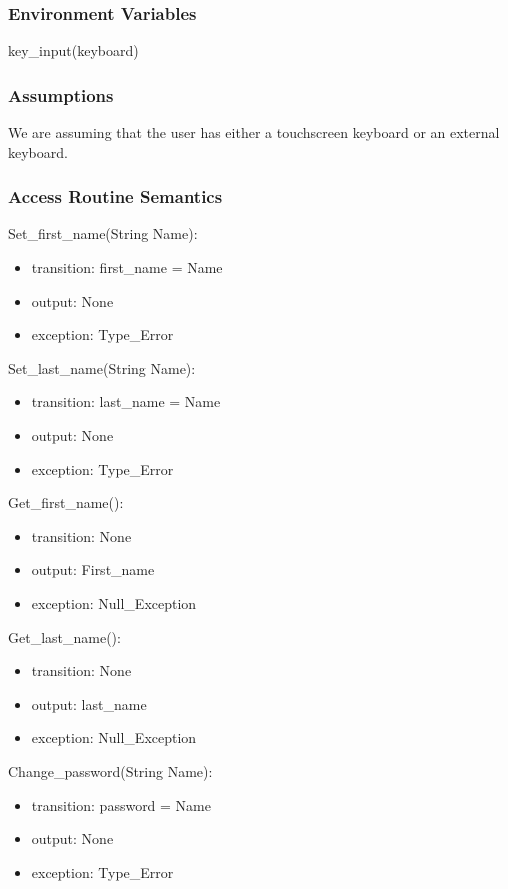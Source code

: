 \documentclass[12pt, titlepage]{article}
\begin{document}
\subsubsection{Environment Variables}

key\_input(keyboard)

\subsubsection{Assumptions}

We are assuming that the user has either a touchscreen keyboard or an external keyboard.

\subsubsection{Access Routine Semantics}

\noindent Set\_first\_name(String Name):
\begin{itemize}
\item transition: first\_name = Name
\item output: None 
\item exception: Type\_Error 
\end{itemize}

\noindent Set\_last\_name(String Name):
\begin{itemize}
\item transition: last\_name = Name
\item output: None 
\item exception: Type\_Error 
\end{itemize}

\noindent Get\_first\_name():
\begin{itemize}
\item transition: None
\item output: First\_name
\item exception: Null\_Exception 
\end{itemize}

\noindent Get\_last\_name():
\begin{itemize}
\item transition: None
\item output: last\_name
\item exception: Null\_Exception 
\end{itemize}


\noindent Change\_password(String Name):
\begin{itemize}
\item transition: password = Name
\item output: None
\item exception: Type\_Error 
\end{itemize}
\end{document}
